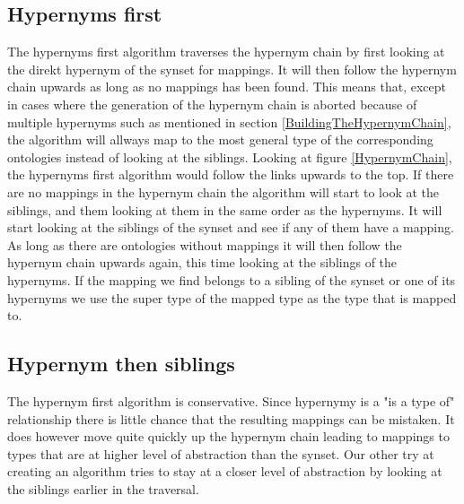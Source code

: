 \subsection{Hypernyms first}
The hypernyms first algorithm traverses the hypernym chain by first looking at the direkt hypernym of the synset for mappings.
It will then follow the hypernym chain upwards as long as no mappings has been found.
This means that,
except in cases where the generation of the hypernym chain is aborted because of multiple hypernyms such as mentioned in section \ref{BuildingTheHypernymChain},
the algorithm will allways map to the most general type of the corresponding ontologies instead of looking at the siblings.
Looking at figure \ref{HypernymChain}, the hypernyms first algorithm would follow the links upwards to the top.
If there are no mappings in the hypernym chain the algorithm will start to look at the siblings,
and them looking at them in the same order as the hypernyms.
It will start looking at the siblings of the synset and see if any of them have a mapping.
As long as there are ontologies without mappings it will then follow the hypernym chain upwards again,
this time looking at the siblings of the hypernyms.
If the mapping we find belongs to a sibling of the synset or one of its hypernyms we use the super type of the mapped
type as the type that is mapped to.

\subsection{Hypernym then siblings}
The hypernym first algorithm is conservative.
Since hypernymy is a "is a type of" relationship there is little chance that the resulting mappings can be mistaken.
It does however move quite quickly up the hypernym chain leading to mappings to types that are at higher level
of abstraction than the synset.
Our other try at creating an algorithm tries to stay at a closer level of abstraction by looking at the siblings earlier
in the traversal.

